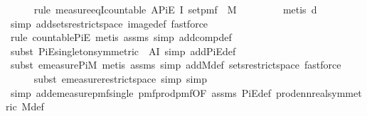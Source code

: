 \begin{isabellebody}
\ \ \ \ \isamarkupfalse%
\ {\isacharparenleft}{\kern0pt}rule\ measure{\isacharunderscore}{\kern0pt}eqI{\isacharunderscore}{\kern0pt}countable{\isacharbrackleft}{\kern0pt}\ A{\isacharequal}{\kern0pt}{\isachardoublequoteopen}PiE\ I\ {\isacharparenleft}{\kern0pt}set{\isacharunderscore}{\kern0pt}pmf\ {\isasymcirc}\ M{\isacharparenright}{\kern0pt}{\isachardoublequoteclose}{\isacharbrackright}{\kern0pt}{\isacharparenright}{\kern0pt}\isanewline
\ \ \ \ \ \ \ \isamarkupfalse%
\ {\isacharparenleft}{\kern0pt}metis\ d{\isacharparenright}{\kern0pt}\isanewline
\ \ \ \ \ \ \isamarkupfalse%
\ {\isacharparenleft}{\kern0pt}simp\ add{\isacharcolon}{\kern0pt}sets{\isacharunderscore}{\kern0pt}restrict{\isacharunderscore}{\kern0pt}space\ image{\isacharunderscore}{\kern0pt}def{\isacharcomma}{\kern0pt}\ fastforce{\isacharparenright}{\kern0pt}\isanewline
\ \ \ \ \ \isamarkupfalse%
\ {\isacharparenleft}{\kern0pt}rule\ countable{\isacharunderscore}{\kern0pt}PiE{\isacharcomma}{\kern0pt}\ metis\ assms{\isacharparenleft}{\kern0pt}{}{\isacharparenright}{\kern0pt}{\isacharcomma}{\kern0pt}\ simp\ add{\isacharcolon}{\kern0pt}comp{\isacharunderscore}{\kern0pt}def{\isacharparenright}{\kern0pt}\isanewline
\ \ \ \ \isamarkupfalse%
\ {\isacharparenleft}{\kern0pt}subst\ PiE{\isacharunderscore}{\kern0pt}singleton{\isacharbrackleft}{\kern0pt}symmetric{\isacharcomma}{\kern0pt}\ \ A{\isacharequal}{\kern0pt}{\isachardoublequoteopen}I{\isachardoublequoteclose}{\isacharbrackright}{\kern0pt}{\isacharcomma}{\kern0pt}\ simp\ add{\isacharcolon}{\kern0pt}PiE{\isacharunderscore}{\kern0pt}def{\isacharparenright}{\kern0pt}\isanewline
\ \ \ \ \isamarkupfalse%
\ {\isacharparenleft}{\kern0pt}subst\ emeasure{\isacharunderscore}{\kern0pt}PiM{\isacharcomma}{\kern0pt}\ metis\ assms{\isacharparenleft}{\kern0pt}{}{\isacharparenright}{\kern0pt}{\isacharcomma}{\kern0pt}\ simp\ add{\isacharcolon}{\kern0pt}M{\isacharprime}{\kern0pt}{\isacharunderscore}{\kern0pt}def\ sets{\isacharunderscore}{\kern0pt}restrict{\isacharunderscore}{\kern0pt}space{\isacharcomma}{\kern0pt}\ fastforce{\isacharparenright}{\kern0pt}\isanewline
\ \ \ \ \isamarkupfalse%
\ {\isacharparenleft}{\kern0pt}subst\ emeasure{\isacharunderscore}{\kern0pt}restrict{\isacharunderscore}{\kern0pt}space{\isacharcomma}{\kern0pt}\ simp{\isacharcomma}{\kern0pt}\ simp{\isacharparenright}{\kern0pt}\isanewline
\ \ \ \ \isamarkupfalse%
\ {\isacharparenleft}{\kern0pt}simp\ add{\isacharcolon}{\kern0pt}emeasure{\isacharunderscore}{\kern0pt}pmf{\isacharunderscore}{\kern0pt}single\ pmf{\isacharunderscore}{\kern0pt}prod{\isacharunderscore}{\kern0pt}pmf{\isacharbrackleft}{\kern0pt}OF\ assms{\isacharparenleft}{\kern0pt}{}{\isacharparenright}{\kern0pt}{\isacharbrackright}{\kern0pt}\ PiE{\isacharunderscore}{\kern0pt}def\ prod{\isacharunderscore}{\kern0pt}ennreal{\isacharbrackleft}{\kern0pt}symmetric{\isacharbrackright}{\kern0pt}\ M{\isacharprime}{\kern0pt}{\isacharunderscore}{\kern0pt}def{\isacharparenright}{\kern0pt}\isanewline

\end{isabellebody}
